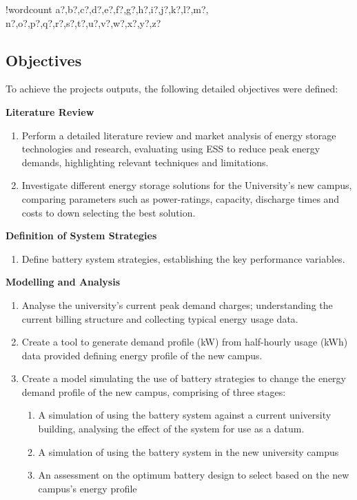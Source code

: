 \documentclass[fontsize=9.5pt]{extarticle}
\numberwithin{figure}{section} %
\newcounter{words}
\newenvironment{counted}{%
  \setcounter{words}{0}
  \SearchList!{wordcount}{\stepcounter{words}}
    {a?,b?,c?,d?,e?,f?,g?,h?,i?,j?,k?,l?,m?,
    n?,o?,p?,q?,r?,s?,t?,u?,v?,w?,x?,y?,z?}
  \UndoBoundary{'}
  \SearchOrder{p;}}{%
  \StopSearching}
\begin{document}
\begin{counted}
\subsection{Objectives}\label{objectives}

To achieve the projects outputs, the following detailed objectives were
defined:

\textbf{Literature Review}

\begin{enumerate}
\item Perform a detailed literature review and market analysis of energy storage technologies and research, evaluating using ESS to reduce peak energy demands, highlighting relevant techniques and limitations.
\item Investigate different energy storage solutions for the University's new campus, comparing parameters such as power-ratings, capacity, discharge times and costs to down selecting the best solution.
\end{enumerate}

\textbf{Definition of System Strategies}

\begin{enumerate}[resume]
\item Define battery system strategies, establishing the key performance variables.
\end{enumerate}

\textbf{Modelling and Analysis}

\begin{enumerate}[resume]
\item Analyse the university’s current peak demand charges; understanding the current billing structure and collecting typical energy usage data.  
\item Create a tool to generate demand profile (kW) from half-hourly usage (kWh) data provided defining energy profile of the new campus.
\item Create a model simulating the use of battery strategies to change the energy demand profile of the new campus, comprising of three stages:
\begin{enumerate}
\item A simulation of using the battery system against a current university building, analysing the effect of the system for use as a datum.
\item A simulation of using the battery system in the new university campus
\item An assessment on the optimum battery design to select based on the new campus's energy profile
\end{enumerate}
\end{enumerate}


\end{counted}
\end{document}
